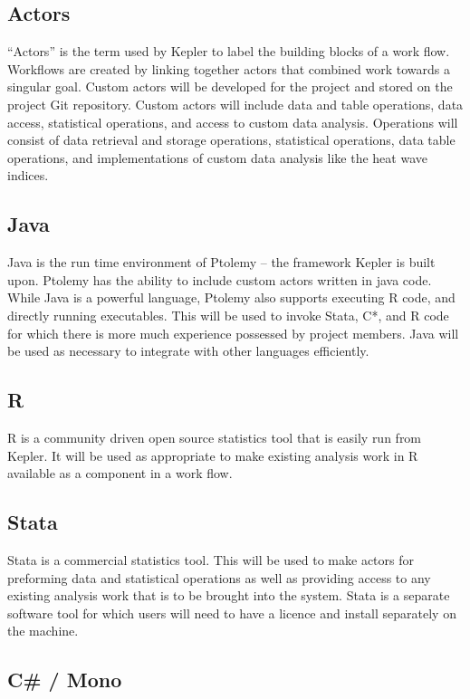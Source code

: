 \documentclass[a4paper]{article}
\begin{document}
\subsection{Actors}
\label{sec-3-3}

“Actors” is the term used by Kepler to label the building blocks of a work flow. Workflows are created by linking together actors that combined work towards a singular goal. Custom actors will be developed for the project and stored on the project Git repository. Custom actors will include data and table operations, data access, statistical operations, and access to custom data analysis. Operations will consist of data retrieval and storage operations, statistical operations, data table operations, and implementations of custom data analysis like the heat wave indices.
\subsection{Java}
\label{sec-3-4}

Java is the run time environment of Ptolemy – the framework Kepler is built upon. Ptolemy has the ability to include custom actors written in java code. While Java is a powerful language, Ptolemy also supports executing R code, and directly running executables. This will be used to invoke Stata, C*, and R code for which there is more much experience possessed by project members. Java will be used as necessary to integrate with other languages efficiently. 
\subsection{R}
\label{sec-3-5}

R is a community driven open source statistics tool that is easily run from Kepler. It will be used as appropriate to make existing analysis work in R available as a component in a work flow.
\subsection{Stata}
\label{sec-3-6}

Stata is a commercial statistics tool. This will be used to make actors for preforming data and statistical operations as well as providing access to any existing analysis work that is to be brought into the system. Stata is a separate software tool for which users will need to have a licence and install separately on the machine.
\subsection{C\# / Mono}
\label{sec-3-7}
\end{document}
